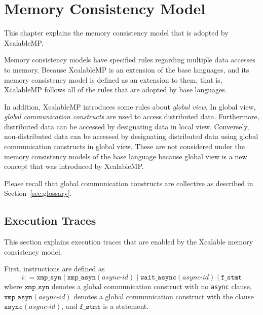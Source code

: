 \chapter{Memory Consistency Model}

\newcommand{\Coloneqq}{\mathrel{\colon\!=}}
\newcommand{\xsync}{\texttt{xmp\_syn}}
\newcommand{\xasync}[1]{\texttt{xmp\_asyn}(#1)}
\newcommand{\waitasync}[1]{\texttt{wait\_async}(#1)}
\newcommand{\fstmt}{\texttt{f\_stmt}}
\newcommand{\F}[2]{\texttt{Fetch}^{#1} \: {#2}}
\newcommand{\E}[2]{\texttt{Execute}^{#1} \: {#2}}
\newcommand{\R}[2]{\texttt{Reflect}^{#1} \: {#2}}



This chapter explains the memory consistency model that is adopted by XcalableMP.

Memory consistency models have specified rules regarding multiple data
accesses to memory.  Because XcalableMP is an extension of the base
languages, and its memory consistency model is defined as an extension
to them, that is, XcalableMP follows all of the rules that are adopted
by base languages.

In addition, XcalableMP introduces some rules about \emph{global
  view}.  In global view, \emph{global communication constructs} are
used to access distributed data.  Furthermore, distributed data can be
accessed by designating data in local view.  Conversely,
non-distributed data can be accessed by designating distributed data
using global communication constructs in global view.  These are not
considered under the memory consistency models of the base language
because global view is a new concept that was introduced by
XcalableMP.

Please recall that global communication constructs are collective as
described in Section~\ref{sec:glossary}.

\section{Execution Traces}

This section explains execution traces that are enabled by the
Xcalable memory consistency model.

First, instructions are defined as
\[
i \Coloneqq \xsync \mid \xasync{\textit{async-id}} \mid \waitasync{\textit{async-id}} \mid \fstmt
\]
where $\xsync$ denotes a global communication construct with no
\texttt{async} clause, $\xasync{\textit{async-id}}$ denotes a global
communication construct with the clause
$\texttt{async}(\textit{async-id})$,
and $\fstmt$ is a statement.

